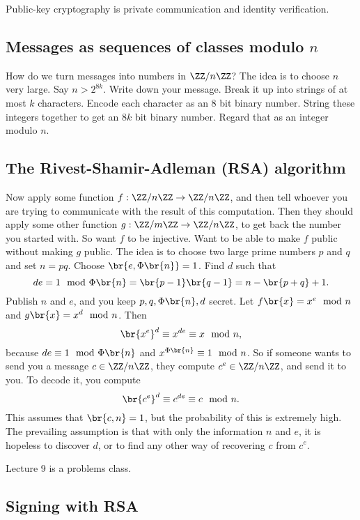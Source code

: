 Public-key cryptography is private communication and identity verification.

\subsection{Messages as sequences of classes modulo \texorpdfstring{$ n $}{n}}

How do we turn messages into numbers in $ \ZZ / n\ZZ $? The idea is to choose $ n $ very large. Say $ n > 2^{8k} $. Write down your message. Break it up into strings of at most $ k $ characters. Encode each character as an $ 8 $ bit binary number. String these integers together to get an $ 8k $ bit binary number. Regard that as an integer modulo $ n $.

\subsection{The Rivest-Shamir-Adleman (RSA) algorithm}

Now apply some function $ f : \ZZ / n\ZZ \to \ZZ / n\ZZ $, and then tell whoever you are trying to communicate with the result of this computation. Then they should apply some other function $ g : \ZZ / m\ZZ \to \ZZ / n\ZZ $, to get back the number you started with. So want $ f $ to be injective. Want to be able to make $ f $ public without making $ g $ public. The idea is to choose two large prime numbers $ p $ and $ q $ and set $ n = pq $. Choose $ \br{e, \Phi\br{n}} = 1 $. Find $ d $ such that
$$ de = 1 \mod \Phi\br{n} = \br{p - 1}\br{q - 1} = n - \br{p + q} + 1. $$
Publish $ n $ and $ e $, and you keep $ p, q, \Phi\br{n}, d $ secret. Let $ f\br{x} = x^e \mod n $ and $ g\br{x} = x^d \mod n $. Then
$$ \br{x^e}^d \equiv x^{de} \equiv x \mod n, $$
because $ de \equiv 1 \mod \Phi\br{n} $ and $ x^{\Phi\br{n}} \equiv 1 \mod n $. So if someone wants to send you a message $ c \in \ZZ / n\ZZ $, they compute $ c^e \in \ZZ / n\ZZ $, and send it to you. To decode it, you compute
$$ \br{c^e}^d \equiv c^{de} \equiv c \mod n. $$
This assumes that $ \br{c, n} = 1 $, but the probability of this is extremely high. The prevailing assumption is that with only the information $ n $ and $ e $, it is hopeless to discover $ d $, or to find any other way of recovering $ c $ from $ c^e $.


Lecture 9 is a problems class.

\subsection{Signing with RSA}

